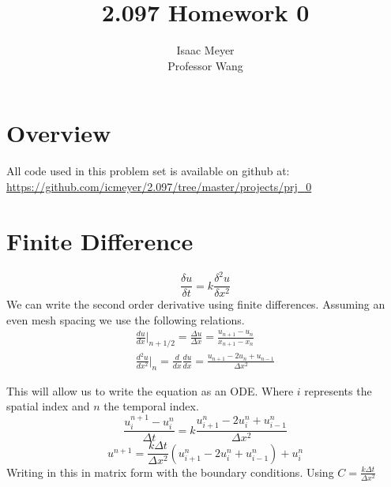 \documentclass[10pt,letter]{article}
\begin{document}


\title{2.097 Homework 0}

\author{Isaac Meyer\\
        Professor Wang}

 
\maketitle 

\section*{Overview}
All code used in this problem set is available on github at: \url{https://github.com/icmeyer/2.097/tree/master/projects/prj_0}\\

\section{Finite Difference}
\[ \frac{\delta u}{\delta t} = k \frac{\delta^2u}{\delta x^2} \]
We can write the second order derivative using finite differences. Assuming an even mesh spacing we use the following relations. 
\begin{align*}
    \frac{du}{dx}\Big|_{n+1/2}=\frac{\Delta u}{\Delta x} = \frac{u_{n+1}-u_n}{x_{n+1}-x_n} \\
    \frac{d^2u}{dx^2}\Big|_{n} = \frac{d}{dx} \frac{du}{dx}= \frac{u_{n+1}-2u_n+u_{n-1}}{\Delta x^2}
\end{align*}

This will allow us to write the equation as an ODE. Where $i$ represents the spatial index and $n$ the temporal index.
\[ \frac{u_i^{n+1}-u_i^n}{\Delta t} = k  \frac{u_{i+1}^n-2u_i^n+u_{i-1}^n}{\Delta x^2} \]
\[ u^{n+1} = \frac{k \Delta t}{\Delta x^2} (u_{i+1}^n-2u_i^n+u_{i-1}^n) + u_i^n \]
Writing in this in matrix form with the boundary conditions. Using $C = \frac{k \Delta t}{\Delta x^2}$
\end{document}
